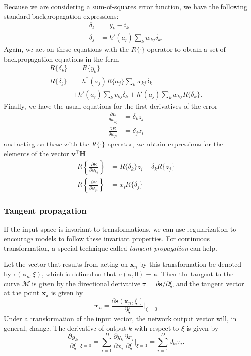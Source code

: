 \documentclass[a4paper]{book}
\renewcommand{\bf}{\mathbf}
\renewcommand{\cal}{\mathcal}
\newcommand{\imp}[1]{\textit{#1}}
\newcommand{\bs}{\boldsymbol}
\begin{document}
Because we are considering a sum-of-squares error function, we have the following standard backpropagation expressions:
\begin{align}
	\delta_k &= y_k - t_k \\
	\delta_j &= h'(a_j) \sum_k w_{kj} \delta_k.
\end{align}
Again, we act on these equations with the $R\{\cdot \}$ operator to obtain a set of backpropagation equations in the form
\begin{align}
	R\{\delta_k\} &= R\{y_k\}\\
	R\{\delta_j \}&= h^{''}(a_j)R\{a_j\} \sum_k w_{kj}\delta_k\\
	&+h'(a_j)\sum_k v_{kj}\delta_k + h'(a_j)\sum_k w_{kj} R\{\delta_k \}.
\end{align}
Finally, we have the usual equations for the first derivatives of the error
\begin{align}
	\frac{\partial E}{\partial w_{kj}} &= \delta_k z_j \\
	\frac{\partial E}{\partial w_{ji}} &= \delta_j x_i
\end{align}
and acting on these with the $R\{ \cdot \}$ operator, we obtain expressions for the elements of the vector $\bf{v}^{\intercal} \bf{H}$
\begin{align}
	R\left\{ \frac{\partial E}{\partial w_{kj}} \right\} &= R\{\delta_k \} z_j + \delta_k R\{z_j\}\\
	R\left\{ \frac{\partial E}{\partial w_{ji}} \right\} &= x_i R\{\delta_j \}
\end{align}
\subsubsection{Tangent propagation} \label{tangentP}
If the input space is invariant to transformations, we can use regularization to encourage models to follow these invariant properties. For continuous transformation, a special technique called \imp{tangent propagation} can help.

Let the vector that results from acting on $\bf{x}_n$ by this transformation be denoted by $s(\bf{x}_n,\xi)$, which is defined so that $s(\bf{x},0) = \bf{x}$. Then the tangent to the curve $\cal{M}$ is given by the directional derivative $\bf{\tau} = \partial \bf{s}/\partial \xi$, and the tangent vector at the point $\bf{x}_n$ is given by
\begin{equation}
	\bs{\tau}_n = \frac{\partial \bf{s}(\bf{x}_n,\xi)}{\partial \xi} \bigg|_{\xi = 0}
\end{equation}
Under a transformation of the input vector, the network output vector will, in general, change. The derivative of output $k$ with respect to $\xi$ is given by
\begin{equation}
	\frac{\partial y_k}{\partial \xi}\bigg|_{\xi = 0} = \sum_{i=1}^{D} \frac{\partial y_k}{\partial x_i}\frac{\partial x_i}{\partial \xi}\bigg|_{\xi = 0} = \sum_{i=1}^{D} J_{ki} \tau_i.
\end{equation}
\end{document}
